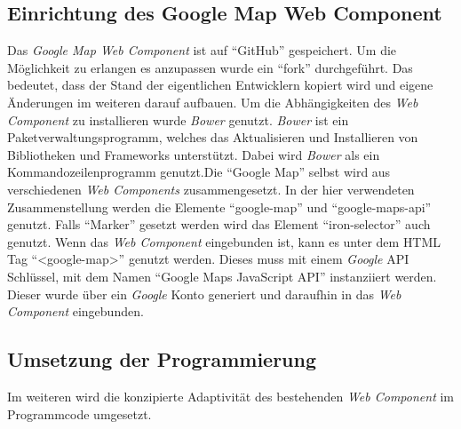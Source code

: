 \documentclass[12pt, paper=a4, bibtotoc, toc=listof, headsepline=true]{scrreprt}
\begin{document}
			\subsection{Einrichtung des Google Map Web Component}
			Das \emph{Google Map Web Component} ist auf \enquote{GitHub} gespeichert. Um die Möglichkeit zu erlangen es anzupassen wurde ein \enquote{fork} durchgeführt. Das bedeutet, dass der Stand der eigentlichen Entwicklern kopiert wird und eigene Änderungen im weiteren darauf aufbauen. Um die Abhängigkeiten des \emph{Web Component} zu installieren wurde \emph{Bower} genutzt. \emph{Bower} ist ein Paketverwaltungsprogramm, welches das Aktualisieren und Installieren von Bibliotheken und Frameworks unterstützt. Dabei wird \emph{Bower} als ein Kommandozeilenprogramm genutzt\cite{bower}.Die \enquote{Google Map} selbst wird aus verschiedenen \emph{Web Components} zusammengesetzt. In der hier verwendeten Zusammenstellung werden die Elemente \enquote{google-map} und \enquote{google-maps-api} genutzt. Falls \enquote{Marker} gesetzt werden wird das Element \enquote{iron-selector} auch genutzt. Wenn das \emph{Web Component} eingebunden ist, kann es unter dem \ac{HTML} Tag \enquote{<google-map>} genutzt werden. Dieses muss mit einem \emph{Google} \ac{API} Schlüssel, mit dem Namen \enquote{Google Maps JavaScript API} instanziiert werden. Dieser wurde über ein \emph{Google} Konto generiert und daraufhin in das \emph{Web Component} eingebunden. 
			\subsection{Umsetzung der Programmierung}
			Im weiteren wird die konzipierte Adaptivität des bestehenden \emph{Web Component} im Programmcode umgesetzt.
\end{document}
